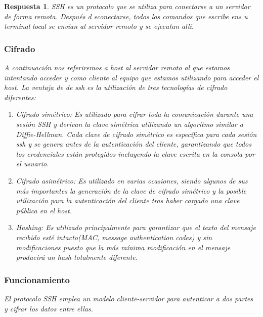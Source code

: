 \documentclass[
  a4paper,
  spanish,
  12pt,
]{scrartcl}
\theoremstyle{ejercicio-style}
\theoremstyle{remark-style}
\newtheorem*{sol}{Respuesta}
\theoremstyle{teorema-style}
\begin{document}
\begin{sol}
  SSH es un protocolo que se utiliza para conectarse a un servidor de forma remota. Después d econectarse, todos los comandos que escribe ens u terminal local se envían al servidor remoto y se ejecutan allí.

  \subsubsection*{Cifrado}
  A continuación nos referiremos a host al servidor remoto al que estamos intentando acceder y como cliente al equipo que estamos utilizando para acceder el host. La ventaja de de ssh es la utilización de tres tecnologías de cifrado diferentes:
  \begin{enumerate}
  \item Cifrado simétrico: Es utilizado para cifrar toda la comunicación durante una sesión SSH y  derivan la clave simétrica utilizando un algoritmo similar a Diffie-Hellman. Cada clave de cifrado simétrico es específica para cada sesión ssh y se genera antes de la autenticación del cliente, garantizando que todos los credenciales están protegidos incluyendo la clave escrita en la consola por el usuario.
  \item Cifrado asimétrico: Es utilizado en varias ocasiones, siendo algunos de sus más importantes la generación de la clave de cifrado simétrico y la posible utilización para la autenticación del cliente tras haber cargado una clave pública en el host.
  \item Hashing: Es utilizado principalmente para garantizar que el texto del mensaje recibido esté intacto(MAC, message authentication codes) y sin modificaciones puesto que la más mínima modificación en el mensaje producirá un hash totalmente diferente.
  \end{enumerate}


  \subsubsection*{Funcionamiento}
  El protocolo SSH emplea un modelo cliente-servidor para autenticar a dos partes y cifrar los datos entre ellas. \\


\end{sol}
\end{document}
